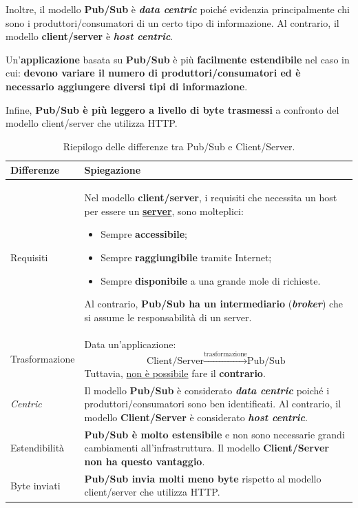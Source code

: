 \documentclass[a4paper]{article}
\begin{document}
	\noindent
	Inoltre, il modello \textbf{Pub/Sub} è \emph{\textbf{data centric}} poiché evidenzia principalmente chi sono i produttori/consumatori di un certo tipo di informazione. Al contrario, il modello \textbf{client/server} è \textbf{\emph{host centric}}.\newline
	
	\noindent
	Un'\textbf{applicazione} basata su \textbf{Pub/Sub} è più \textbf{facilmente estendibile} nel caso in cui: \textbf{devono variare il numero di produttori/consumatori ed è necessario aggiungere diversi tipi di informazione}.\newline
	
	\noindent
	Infine, \textbf{Pub/Sub è più leggero a livello di byte trasmessi} a confronto del modello client/server che utilizza HTTP.
	
	\begin{table}[!htp]
		\centering
		\begin{tabular}{@{} l p{26em} @{}}
			\toprule
			Differenze 	& Spiegazione \\
			\midrule
			Requisiti	& Nel modello \textbf{client/server}, i requisiti che necessita un host per essere un \textbf{\underline{server}}, sono molteplici:
			\begin{itemize}
				\item Sempre \textbf{accessibile};
				
				\item Sempre \textbf{raggiungibile} tramite Internet;
				
				\item Sempre \textbf{disponibile} a una grande mole di richieste.
			\end{itemize}
			Al contrario, \textbf{Pub/Sub ha un intermediario} (\emph{\textbf{broker}}) che si assume le responsabilità di un server. \\ [.5em]
			Trasformazione & Data un'applicazione:
			\begin{equation*}
				\text{Client/Server} \xrightarrow{\text{trasformazione}} \text{Pub/Sub}
			\end{equation*}
			Tuttavia, \underline{non è possibile} fare il \textbf{contrario}. \\ [.5em]
			\emph{Centric}	& Il modello \textbf{Pub/Sub} è considerato \emph{\textbf{data centric}} poiché i produttori/consumatori sono ben identificati. Al contrario, il modello \textbf{Client/Server} è considerato \emph{\textbf{host centric}}. \\ [.5em]
			Estendibilità 	& \textbf{Pub/Sub è molto estensibile} e non sono necessarie grandi cambiamenti all'infrastruttura. Il modello \textbf{Client/Server non ha questo vantaggio}. \\ [.5em]
			Byte inviati 	& \textbf{Pub/Sub invia molti meno byte} rispetto al modello client/server che utilizza HTTP. \\
			\bottomrule
		\end{tabular}
		\caption{Riepilogo delle differenze tra Pub/Sub e Client/Server.}
	\end{table}
	
\end{document}
